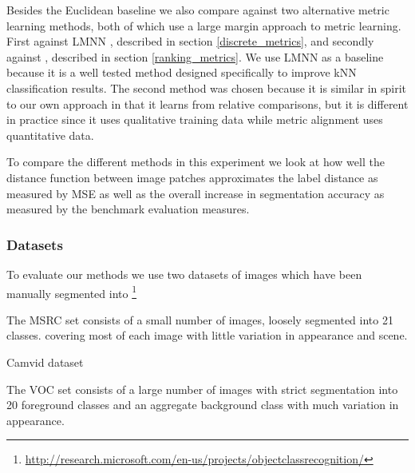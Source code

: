 \documentclass[a4paper,titlepage]{article}
\begin{document}
Besides the Euclidean baseline we also compare against two alternative metric learning methods, both of which use a large margin approach to metric learning. First against \ac{LMNN} \cite{weinberger2009distance}, described in section \ref{discrete_metrics}, and secondly against \cite{schultz2003learning}, described in section \ref{ranking_metrics}. We use \ac{LMNN} as a baseline because it is a well tested method designed specifically to improve \ac{kNN} classification results. The second method was chosen because it is similar in spirit to our own approach in that it learns from relative comparisons, but it is different in practice since it uses qualitative training data while metric alignment uses quantitative data.

To compare the different methods in this experiment we look at how well the distance function between image patches approximates the label distance as measured by \ac{MSE} as well as the overall increase in segmentation accuracy as measured by the benchmark evaluation measures.



\subsubsection{Datasets}

To evaluate our methods we use two datasets of images which have been manually segmented into  \footnote{\url{http://research.microsoft.com/en-us/projects/objectclassrecognition/}}

The MSRC set consists of a small number of images, loosely segmented into 21 classes. covering most of each image with little variation in appearance and scene.

Camvid dataset

The VOC set consists of a large number of images with strict segmentation into 20 foreground classes and an aggregate background class with much variation in appearance. %
\end{document}
